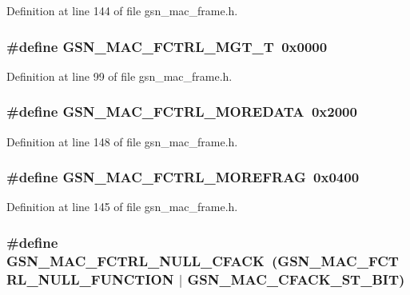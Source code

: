 Definition at line 144 of file gsn\_\-mac\_\-frame.h.

\hypertarget{a00523_af2c466a0167540196b435b458bc1e9ed}{
\subsubsection[{GSN\_\-MAC\_\-FCTRL\_\-MGT\_\-T}]{\setlength{\rightskip}{0pt plus 5cm}\#define GSN\_\-MAC\_\-FCTRL\_\-MGT\_\-T~0x0000}}
\label{a00523_af2c466a0167540196b435b458bc1e9ed}


Definition at line 99 of file gsn\_\-mac\_\-frame.h.

\hypertarget{a00523_ad6de82137f4685de8308859032f5ea2e}{
\subsubsection[{GSN\_\-MAC\_\-FCTRL\_\-MOREDATA}]{\setlength{\rightskip}{0pt plus 5cm}\#define GSN\_\-MAC\_\-FCTRL\_\-MOREDATA~0x2000}}
\label{a00523_ad6de82137f4685de8308859032f5ea2e}


Definition at line 148 of file gsn\_\-mac\_\-frame.h.

\hypertarget{a00523_aee929bb445c92201ad1bbd53a9a730bf}{
\subsubsection[{GSN\_\-MAC\_\-FCTRL\_\-MOREFRAG}]{\setlength{\rightskip}{0pt plus 5cm}\#define GSN\_\-MAC\_\-FCTRL\_\-MOREFRAG~0x0400}}
\label{a00523_aee929bb445c92201ad1bbd53a9a730bf}


Definition at line 145 of file gsn\_\-mac\_\-frame.h.

\hypertarget{a00523_ac4ded1d7391249cdae9e7feee7d6415c}{
\subsubsection[{GSN\_\-MAC\_\-FCTRL\_\-NULL\_\-CFACK}]{\setlength{\rightskip}{0pt plus 5cm}\#define GSN\_\-MAC\_\-FCTRL\_\-NULL\_\-CFACK~(GSN\_\-MAC\_\-FCTRL\_\-NULL\_\-FUNCTION  $|$ GSN\_\-MAC\_\-CFACK\_\-ST\_\-BIT)}}
\label{a00523_ac4ded1d7391249cdae9e7feee7d6415c}


